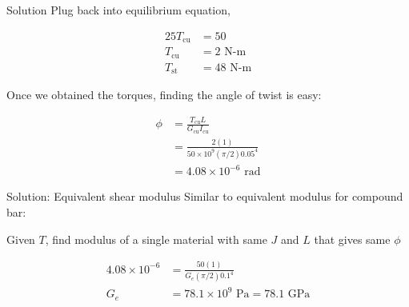 \documentclass[10pt, svgnames]{beamer}
\begin{document}
\begin{frame}[label={sec:org1267b4c}]{Solution}
Plug back into equilibrium equation,

\begin{align*}
    25 T_{\text{cu}} &= 50 \\
    T_{\text{cu}}  &= 2 \text{ N-m} \\
    T_{\text{st}}  &= 48 \text{ N-m}
\end{align*}

Once we obtained the torques, finding the angle of twist is easy:

\begin{align*}
    \phi &= \frac{T_{\text{cu}} L}{G_{\text{cu}}I_{\text{cu}}} \\
         &= \frac{2(1)}{50 \times 10^{9}(\pi/2)0.05^{4}} \\
         &= 4.08 \times 10^{-6} \text{ rad}
\end{align*}
\end{frame}

\begin{frame}[label={sec:org86f63e5}]{Solution: Equivalent shear modulus}
Similar to equivalent modulus for compound bar:

Given \(T\), find modulus of a single material with same \(J\) and \(L\)
that gives same \(\phi\)

\begin{align*}
    4.08 \times 10^{-6} &= \frac{50(1)}{G_{e}(\pi/2)0.1^{4}} \\
    G_{e} &= 78.1 \times 10^{9} \text{ Pa} = 78.1 \text{ GPa}
\end{align*}
\end{frame}
\end{document}
